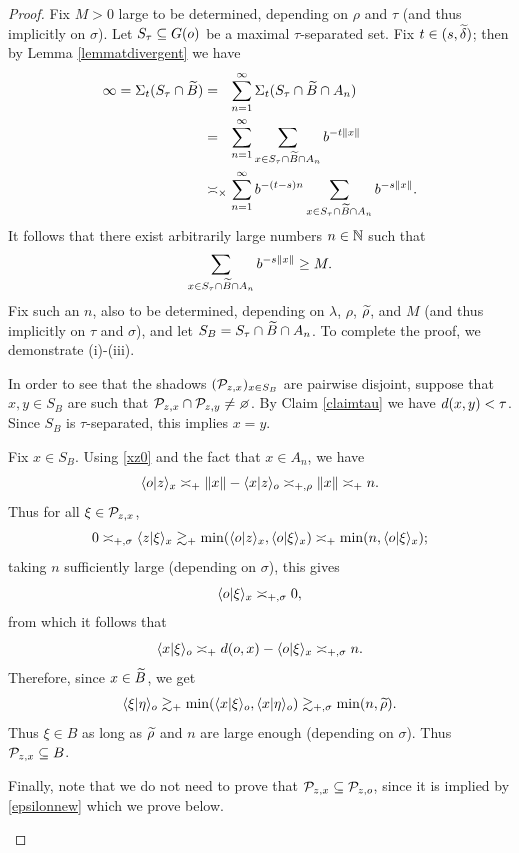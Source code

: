 \begin{proof}
Fix $M > 0$ large to be determined, depending on $\rho$ and $\tau$ (and thus implicitly on $\sigma$). Let $S_\tau\subseteq G(o)$ be a maximal $\tau$-separated set. Fix $t\in (s,\widetilde\delta)$; then by Lemma \ref{lemmatdivergent} we have
\begin{align*}
\infty
= \Sigma_t(S_\tau\cap \w B)
&=_\pt \sum_{n = 1}^\infty\Sigma_t(S_\tau\cap\w B\cap A_n)\\
&=_\pt \sum_{n = 1}^\infty\sum_{x\in S_\tau\cap\w B\cap A_n}b^{-t\dox x}\\
&\asymp_\times \sum_{n = 1}^\infty b^{-(t - s)n}\sum_{x\in S_\tau\cap\w B\cap A_n} b^{-s\dox x}.
\end{align*}
It follows that there exist arbitrarily large numbers $n\in\N$ such that
\begin{equation}
\label{ndef}
\sum_{x\in S_\tau\cap\widetilde B\cap A_n} b^{-s\|x\|} \geq M.
\end{equation}
Fix such an $n$, also to be determined, depending on $\lambda$, $\rho$, $\widetilde\rho$, and $M$ (and thus implicitly on $\tau$ and $\sigma$), and let $S_B = S_\tau\cap \widetilde B\cap A_n$. To complete the proof, we demonstrate (i)-(iii).
\begin{subproof}
In order to see that the shadows $(\mathcal P_{z,x})_{x\in S_B}$ are pairwise disjoint, suppose that $x,y\in S_B$ are such that $\PP_{z,x}\cap \PP_{z,y}\neq\emptyset$. By Claim \ref{claimtau} we have $d(x,y) < \tau$. Since $S_B$ is $\tau$-separated, this implies $x = y$.

Fix $x\in S_B$. Using \eqref{xz0} and the fact that $x\in A_{n}$, we have
\[
\langle o|z\rangle_x \asymp_+ \|x\| - \langle x|z\rangle_o\asymp_{+,\rho} \|x\|\asymp_+ n.
\]
Thus for all $\xi\in\mathcal P_{z,x}$,
\[
0
\asymp_{+,\sigma} \langle z|\xi\rangle_x
\gtrsim_+ \min(\langle o|z\rangle_x,\langle o|\xi\rangle_x)
\asymp_+ \min(n,\langle o|\xi\rangle_x);
\]
taking $n$ sufficiently large (depending on $\sigma$), this gives
\[
\langle o|\xi\rangle_x \asymp_{+,\sigma} 0,
\]
from which it follows that
\[
\langle x|\xi\rangle_o
\asymp_+ d(o,x)-\langle o|\xi\rangle_x
\asymp_{+,\sigma} n.
\]
Therefore, since $x\in\widetilde B$, we get
\[
\langle\xi|\eta\rangle_o
\gtrsim_+ \min(\langle x|\xi\rangle_o,\langle x|\eta\rangle_o)
\gtrsim_{+,\sigma} \min(n,\widetilde\rho).
\]
Thus $\xi\in B$ as long as $\widetilde\rho$ and $n$ are large enough (depending on $\sigma$). Thus $\mathcal P_{z,x}\subseteq B$.

Finally, note that we do not need to prove that $\mathcal P_{z,x}\subseteq \mathcal P_{z,o}$, since it is implied by \eqref{epsilonnew} which we prove below.


\end{subproof}
\end{proof}
